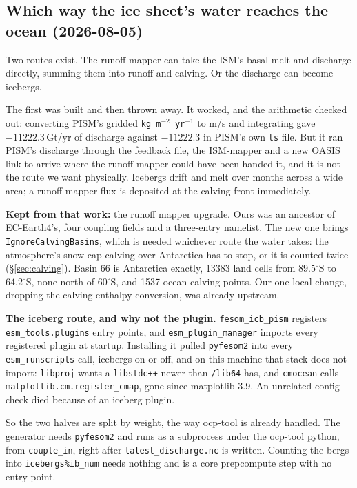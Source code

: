 \documentclass[11pt,a4paper]{article}
\newcommand{\code}[1]{\texttt{\small #1}}
\begin{document}
\subsection{Which way the ice sheet's water reaches the ocean (2026-08-05)}
\label{sec:fwreturn}

Two routes exist. The runoff mapper can take the ISM's basal melt and discharge directly, summing
them into runoff and calving. Or the discharge can become icebergs.

The first was built and then thrown away. It worked, and the arithmetic checked out: converting
PISM's gridded \code{kg\,m$^{-2}$\,yr$^{-1}$} to m/s and integrating gave $-11222.3$\,Gt/yr of
discharge against $-11222.3$ in PISM's own \code{ts} file. But it ran PISM's discharge through the
feedback file, the ISM-mapper and a new OASIS link to arrive where the runoff mapper could have
been handed it, and it is not the route we want physically. Icebergs drift and melt over months
across a wide area; a runoff-mapper flux is deposited at the calving front immediately.

\medskip\noindent
\textbf{Kept from that work:} the runoff mapper upgrade. Ours was an ancestor of EC-Earth4's, four
coupling fields and a three-entry namelist. The new one brings \code{IgnoreCalvingBasins}, which is
needed whichever route the water takes: the atmosphere's snow-cap calving over Antarctica has to
stop, or it is counted twice (\S\ref{sec:calving}). Basin 66 is Antarctica exactly, 13383 land cells
from $89.5^\circ$S to $64.2^\circ$S, none north of $60^\circ$S, and 1537 ocean calving points. Our
one local change, dropping the calving enthalpy conversion, was already upstream.

\medskip\noindent
\textbf{The iceberg route, and why not the plugin.} \code{fesom\_icb\_pism} registers
\code{esm\_tools.plugins} entry points, and \code{esm\_plugin\_manager} imports every registered
plugin at startup. Installing it pulled \code{pyfesom2} into every \code{esm\_runscripts} call,
icebergs on or off, and on this machine that stack does not import: \code{libproj} wants a
\code{libstdc++} newer than \code{/lib64} has, and \code{cmocean} calls
\code{matplotlib.cm.register\_cmap}, gone since matplotlib 3.9. An unrelated config check died
because of an iceberg plugin.

So the two halves are split by weight, the way ocp-tool is already handled. The generator needs
\code{pyfesom2} and runs as a subprocess under the ocp-tool python, from \code{couple\_in}, right
after \code{latest\_discharge.nc} is written. Counting the bergs into \code{icebergs\%ib\_num} needs
nothing and is a core prepcompute step with no entry point.
\end{document}

